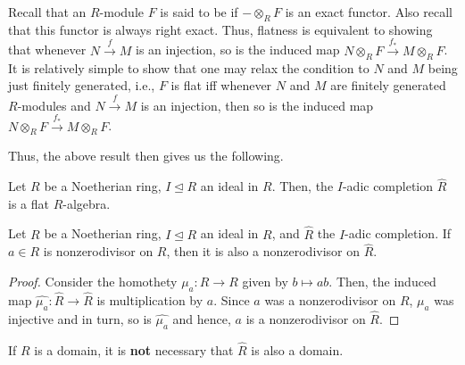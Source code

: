 Recall that an $R$-module $F$ is said to be  if $- \otimes_{R} F$ is an exact functor. Also recall that this functor is always right exact. Thus, flatness is equivalent to showing that whenever $N \xrightarrow{f} M$ is an injection, so is the induced map $N \otimes_{R} F \xrightarrow{f_{\ast}} M \otimes_{R} F$. \newline
It is relatively simple to show that one may relax the condition to $N$ and $M$ being just finitely generated, i.e., $F$ is flat iff whenever $N$ and $M$ are finitely generated $R$-modules and $N \xrightarrow{f} M$ is an injection, then so is the induced map $N \otimes_{R} F \xrightarrow{f_{\ast}} M \otimes_{R} F$.

Thus, the above result then gives us the following.

\begin{cor}
	Let $R$ be a Noetherian ring, $I \unlhd R$ an ideal in $R$. Then, the $I$-adic completion $\widehat{R}$ is a flat $R$-algebra.
\end{cor}

\begin{cor}
	Let $R$ be a Noetherian ring, $I \unlhd R$ an ideal in $R$, and $\widehat{R}$ the $I$-adic completion. If $a \in R$ is nonzerodivisor on $R$, then it is also a nonzerodivisor on $\widehat{R}$.
\end{cor}
\begin{proof} 
	Consider the homothety $\mu_{a} : R \to R$ given by $b \mapsto ab$. Then, the induced map $\widehat{\mu_{a}} : \widehat{R} \to \widehat{R}$ is multiplication by $a$. Since $a$ was a nonzerodivisor on $R$, $\mu_{a}$ was injective and in turn, so is $\widehat{\mu_{a}}$ and hence, $a$ is a nonzerodivisor on $\widehat{R}$.
\end{proof}

\begin{rem}
	If $R$ is a domain, it is \textbf{not} necessary that $\widehat{R}$ is also a domain. %
\end{rem}

